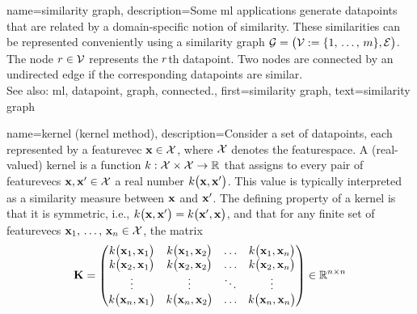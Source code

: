 {name={similarity graph}, 
 	description={Some \gls{ml} applications generate \glspl{datapoint} that 
 		are related by a domain-specific notion of similarity. These similarities can be 
 		represented conveniently using a similarity \gls{graph} $\mathcal{G} = \big(\mathcal{V} := \{1, \,\ldots, \,m\}, \mathcal{E}\big)$. 
 		The node $r \in \mathcal{V}$ represents the $r$th \gls{datapoint}. Two 
 		nodes are \gls{connected} by an undirected edge if the corresponding \glspl{datapoint} are similar. 
				\\
		See also: \gls{ml}, \gls{datapoint}, \gls{graph}, \gls{connected}.},
 	first={similarity graph},
	text={similarity graph} 
}

{name={kernel (kernel method)}, 
	description={Consider a set of \glspl{datapoint}, each represented by a \gls{featurevec} 
	 	${\bf x} \in \mathcal{X}$, where $\mathcal{X}$ denotes the \gls{featurespace}. 
	 	A (real-valued) kernel is a \gls{function} 
	 	$k: \mathcal{X} \times \mathcal{X} \rightarrow \mathbb{R}$ that assigns to every pair of 
     		\glspl{featurevec} ${\bf x}, {\bf x}' \in \mathcal{X}$ a real number $k\big({\bf x},{\bf x}'\big)$. 
     		This value is typically interpreted as a similarity \gls{measure} between ${\bf x}$ and ${\bf x}'$. 
	 	The defining property of a kernel is that it is symmetric, i.e.,
	 	$k\big({\bf x},{\bf x}'\big) = k\big({\bf x}',{\bf x}\big)$, and that 
	 	for any finite set of \glspl{featurevec} ${\bf x}_1, \,\ldots, \,{\bf x}_n \in \mathcal{X}$, the \gls{matrix} 
	  	\begin{equation}
	 		\nonumber
	 		\mathbf{K} = \begin{pmatrix}
	 			k\big({\bf x}_1,{\bf x}_1\big) & k\big({\bf x}_1,{\bf x}_2\big) & \ldots & k\big({\bf x}_1,{\bf x}_n\big) \\
	 			k\big({\bf x}_2,{\bf x}_1\big) & k\big({\bf x}_2,{\bf x}_2\big) & \ldots & k\big({\bf x}_2,{\bf x}_n\big) \\
	 			\vdots											
	 			& \vdots & \ddots & \vdots \\
	 			k\big({\bf x}_n,{\bf x}_1\big) & k\big({\bf x}_n,{\bf x}_2\big) & \ldots & k\big({\bf x}_n,{\bf x}_n\big) 
	 		\end{pmatrix} \in \mathbb{R}^{n \times n}
	 	\end{equation}
}}
